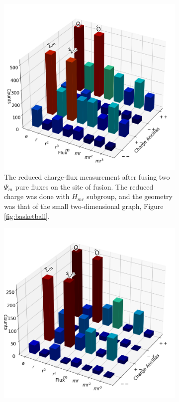 \documentclass[two column]{article}
\begin{document}
\begin{figure}
\begin{subfigure}{0.47\textwidth}
    \includegraphics[width=\linewidth]{Figures/fusion_on_basketball.png}
    \caption{The reduced charge-flux measurement after fusing two $\Psi_m$ pure fluxes on the site of fusion. The reduced charge was done with $H_{mr}$ subgroup, and the geometry was that of the small two-dimensional graph, Figure \ref{fig:basketball}.}
    \label{fig:fusion_basketball}
\end{subfigure}
\vspace{15pt}
\begin{subfigure}{0.47\textwidth}
    \includegraphics[width=\linewidth]{Figures/braid_fusion.png}

\end{subfigure}
\end{figure}
\end{document}
